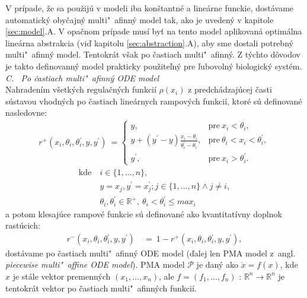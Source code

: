 \documentclass[11pt,final,oneside]{fithesis}
\begin{document}
V pr\'ipade, \v ze sa pou\v zij\'u v modeli iba kon\v stantn\'e a line\'arne funckie, dost\'avame automatick\'y oby\v cajn\'y multi"~afinn\'y model tak, ako
je uveden\'y v kapitole \ref{sec:model}.A. V opa\v cnom pr\'ipade mus\'i by\v t na tento model aplikovan\'a optim\'alna line\'arna abstrakcia (vi\v d 
kapitolu \ref{sec:abstraction}.A), aby sme 
dostali potrebn\'y multi"~afinn\'y model. Tentokr\'at v\v sak po \v castiach multi"~afinn\'y. Z t\'ychto d\^ ovodov je takto definovann\'y model prakticky 
pou\v zite\v ln\'y pre \v lubovoln\'y biologick\'y syst\'em.
\cite{HIBI-2009}\cite{HIBI-2010}
\\

\noindent
\textit{C. \ Po \v castiach multi"~afinn\'y ODE model}
\\

Nahraden\'im v\v setk\'ych regula\v cn\'ych funkci\'i $\rho(x_i)$ z predch\'adzaj\'ucej \v casti s\'ustavou vhodn\'ych po \v castiach line\'arnych 
rampov\'ych funkci\'i, ktor\'e s\'u definovan\'e 
nasledovne:
\begin{align*}
	r^+ (x_i,\theta{}_i,\theta{}_i^{'},y,y^{'}) \ = \left\{ \begin{array}{cl}
y, & \textrm{pre} \ x_i < \theta_i,\\
y + (y^{'} - y)\frac{x_i - \theta_i}{\theta_i^{'} - \theta_i}, & \textrm{pre} \ \theta_i < x_i < \theta_i^{'},\\
y^{'}, & \textrm{pre} \ x_i > \theta_i^{'}.
	\end{array}
	\right.
\end{align*}
\begin{align*}
	\textrm{kde} \ &i \in \{1,\dots{},n\},\\
	&y = x_j, y^{'} = x_j^{'}; j \in \{1,\dots{},n\} \wedge j \neq i,\\
	&\theta_i, \theta_i^{'} \in \mathbb{R}^+, \ \theta_i < \theta_i^{'} \leq max_i
\end{align*}
a potom klesaj\'uce rampov\'e funkcie s\'u definovan\'e ako kvantitat\'ivny doplnok rast\'ucich:
\begin{align*}
r^- (x_i,\theta{}_i,\theta{}_i^{'},y,y^{'}) &\ = \ 1 - r^+ (x_i,\theta{}_i,\theta{}_i^{'},y,y^{'}),
\end{align*}
dost\'avame po \v castiach multi"~a\-fin\-n\'y ODE model 
(\v dalej len PMA model z~angl. \textit{piecewise multi"~affine ODE model}). PMA model $\mathcal{P}$ je dan\'y ako $\dot{x} = f(x)$, 
kde $x$ je st\'ale vektor premenn\'ych $(x_1,\dots{},x_n)$, ale $f = (f_1,\dots{},f_n)$ : $\mathbb{R}^n \rightarrow \mathbb{R}^n$ je tentokr\'at vektor 
po \v castiach multi"~afinn\'ych funkci\'i. 
\end{document}
